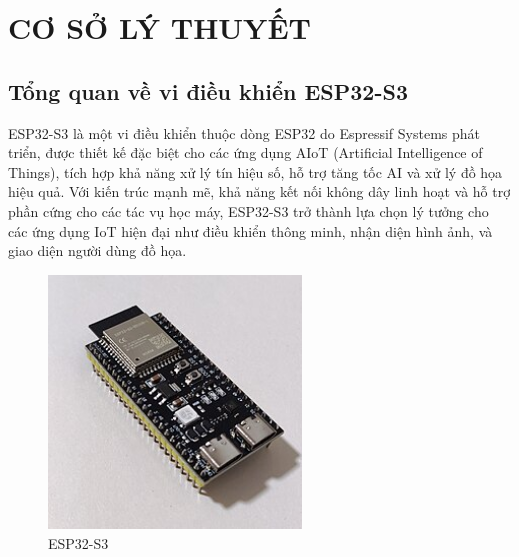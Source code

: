 \chapter{CƠ SỞ LÝ THUYẾT}
\section{Tổng quan về vi điều khiển ESP32-S3}
\tab ESP32-S3 là một vi điều khiển thuộc dòng ESP32 do Espressif Systems phát triển, được thiết kế đặc biệt cho các ứng dụng AIoT (Artificial Intelligence of Things), tích hợp khả năng xử lý tín hiệu số, hỗ trợ tăng tốc AI và xử lý đồ họa hiệu quả. Với kiến trúc mạnh mẽ, khả năng kết nối không dây linh hoạt và hỗ trợ phần cứng cho các tác vụ học máy, ESP32-S3 trở thành lựa chọn lý tưởng cho các ứng dụng IoT hiện đại như điều khiển thông minh, nhận diện hình ảnh, và giao diện người dùng đồ họa.

\begin{figure}[H]
    \centering
    \includegraphics[width=0.6\textwidth]{Images/ESP32-S3_on_paper.jpg}
    \caption{ESP32-S3}
\end{figure}

